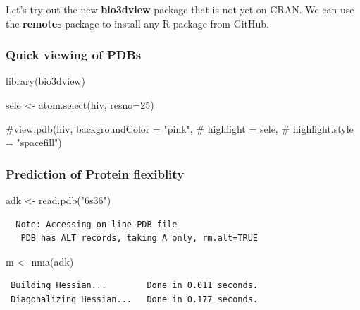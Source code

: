\documentclass[
  letterpaper,
  DIV=11,
  numbers=noendperiod]{scrartcl}
\newenvironment{Shaded}{\begin{snugshade}}{\end{snugshade}}
\newcommand{\AttributeTok}[1]{\textcolor[rgb]{0.40,0.45,0.13}{#1}}
\newcommand{\CommentTok}[1]{\textcolor[rgb]{0.37,0.37,0.37}{#1}}
\newcommand{\DecValTok}[1]{\textcolor[rgb]{0.68,0.00,0.00}{#1}}
\newcommand{\FunctionTok}[1]{\textcolor[rgb]{0.28,0.35,0.67}{#1}}
\newcommand{\NormalTok}[1]{\textcolor[rgb]{0.00,0.23,0.31}{#1}}
\newcommand{\OtherTok}[1]{\textcolor[rgb]{0.00,0.23,0.31}{#1}}
\newcommand{\StringTok}[1]{\textcolor[rgb]{0.13,0.47,0.30}{#1}}
\begin{document}
Let's try out the new \textbf{bio3dview} package that is not yet on
CRAN. We can use the \textbf{remotes} package to install any R package
from GitHub.

\subsubsection{Quick viewing of PDBs}\label{quick-viewing-of-pdbs}

\begin{Shaded}
\begin{Highlighting}[]
\FunctionTok{library}\NormalTok{(bio3dview)}

\NormalTok{sele }\OtherTok{\textless{}{-}} \FunctionTok{atom.select}\NormalTok{(hiv, }\AttributeTok{resno=}\DecValTok{25}\NormalTok{)}

\CommentTok{\#view.pdb(hiv, backgroundColor = "pink",}
\CommentTok{\#         highlight = sele,}
\CommentTok{\#         highlight.style = "spacefill")}
\end{Highlighting}
\end{Shaded}

\subsubsection{Prediction of Protein
flexiblity}\label{prediction-of-protein-flexiblity}

\begin{Shaded}
\begin{Highlighting}[]
\NormalTok{adk }\OtherTok{\textless{}{-}} \FunctionTok{read.pdb}\NormalTok{(}\StringTok{"6s36"}\NormalTok{)}
\end{Highlighting}
\end{Shaded}

\begin{verbatim}
  Note: Accessing on-line PDB file
   PDB has ALT records, taking A only, rm.alt=TRUE
\end{verbatim}

\begin{Shaded}
\begin{Highlighting}[]
\NormalTok{m }\OtherTok{\textless{}{-}} \FunctionTok{nma}\NormalTok{(adk)}
\end{Highlighting}
\end{Shaded}

\begin{verbatim}
 Building Hessian...        Done in 0.011 seconds.
 Diagonalizing Hessian...   Done in 0.177 seconds.
\end{verbatim}
\end{document}
